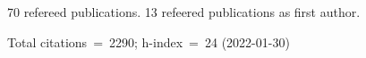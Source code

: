 70 refereed publications. 13 refeered publications as first author.

Total citations~=~2290; h-index~=~24 (2022-01-30)